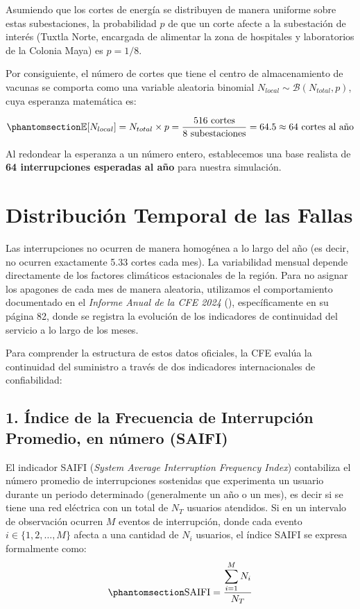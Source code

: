 \documentclass[
  spanish,
  us-letterpaper,
]{scrreprt}
\numberwithin{equation}{section}
\theoremstyle{plain}
\theoremstyle{plain}
\theoremstyle{definition}
\theoremstyle{plain}
\theoremstyle{remark}
\begin{document}
Asumiendo que los cortes de energía se distribuyen de manera uniforme
sobre estas subestaciones, la probabilidad \(p\) de que un corte afecte
a la subestación de interés (Tuxtla Norte, encargada de alimentar la
zona de hospitales y laboratorios de la Colonia Maya) es \(p = 1/8\).

Por consiguiente, el número de cortes que tiene el centro de
almacenamiento de vacunas se comporta como una variable aleatoria
binomial \(N_{local} \sim \mathcal{B}(N_{total}, p)\), cuya esperanza
matemática es:

\begin{equation}\phantomsection\label{eq-esperanza-local}{
\mathbb{E}[N_{local}] = N_{total} \times p = \frac{516 \text{ cortes}}{8 \text{ subestaciones}} = 64.5 \approx 64 \text{ cortes al año}
}\end{equation}

Al redondear la esperanza a un número entero, establecemos una base
realista de \textbf{64 interrupciones esperadas al año} para nuestra
simulación.

\section{Distribución Temporal de las
Fallas}\label{sec-distribucion-temporal}

Las interrupciones no ocurren de manera homogénea a lo largo del año (es
decir, no ocurren exactamente 5.33 cortes cada mes). La variabilidad
mensual depende directamente de los factores climáticos estacionales de
la región. Para no asignar los apagones de cada mes de manera aleatoria,
utilizamos el comportamiento documentado en el \emph{Informe Anual de la
CFE 2024} (), específicamente en su página 82, donde se registra
la evolución de los indicadores de continuidad del servicio a lo largo
de los meses.

Para comprender la estructura de estos datos oficiales, la CFE evalúa la
continuidad del suministro a través de dos indicadores internacionales
de confiabilidad:

\subsection{1. Índice de la Frecuencia de Interrupción Promedio, en
número
(SAIFI)}\label{uxedndice-de-la-frecuencia-de-interrupciuxf3n-promedio-en-nuxfamero-saifi}

El indicador SAIFI (\emph{System Average Interruption Frequency Index})
contabiliza el número promedio de interrupciones sostenidas que
experimenta un usuario durante un periodo determinado (generalmente un
año o un mes), es decir si se tiene una red eléctrica con un total de
\(N_T\) usuarios atendidos. Si en un intervalo de observación ocurren
\(M\) eventos de interrupción, donde cada evento
\(i \in \{1, 2, \dots, M\}\) afecta a una cantidad de \(N_i\) usuarios,
el índice SAIFI se expresa formalmente como:
\begin{equation}\phantomsection\label{eq-saifi}{
\displaystyle \text{SAIFI} = \displaystyle \dfrac{\displaystyle \sum_{i=1}^{M} N_i}{N_T}
}\end{equation}
\end{document}
